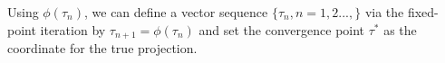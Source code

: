 \documentclass{article}
\newtheorem{theorem}{Theorem}[section]
\theoremstyle{remark}
\begin{document}
Using $\phi(\tau_n)$, we can define a vector sequence $\{\tau_n, n = 1,2...,\}$ via the fixed-point iteration by
$\tau_{n+1} = \phi(\tau_n)$
and set the convergence point $\tau^*$ as the coordinate for the true projection.
\end{document}
